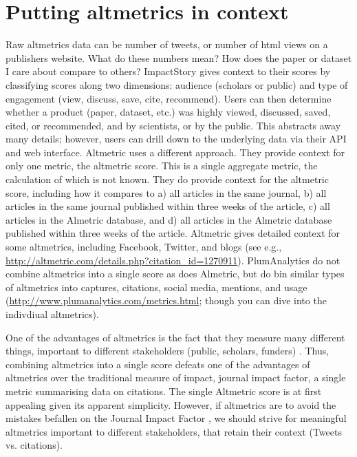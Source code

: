 \documentclass[letterpaper,superscriptaddress,showkeys,longbibliography]{revtex4-1}\usepackage{graphicx, color}
\begin{document}
\section*{Putting altmetrics in context}

Raw altmetrics data can be number of tweets, or number of html views on a publishers website. What do these numbers mean? How does the paper or dataset I care about compare to others? ImpactStory gives context to their scores by classifying scores along two dimensions: audience (scholars or public) and type of engagement (view, discuss, save, cite, recommend). Users can then determine whether a product (paper, dataset, etc.) was highly viewed, discussed, saved, cited, or recommended, and by scientists, or by the public. This abstracts away many details; however, users can drill down to the underlying data via their API and web interface.  Altmetric uses a different approach. They provide context for only one metric, the altmetric score. This is a single aggregate metric, the calculation of which is not known. They do provide context for the altmetric score, including how it compares to a) all articles in the same journal, b) all articles in the same journal published within three weeks of the article, c) all articles in the Almetric database, and d) all articles in the Almetric database published within three weeks of the article. Altmetric gives detailed context for some altmetrics, including Facebook, Twitter, and blogs (see e.g., \url{http://altmetric.com/details.php?citation_id=1270911}). PlumAnalytics do not combine altmetrics into a single score as does Almetric, but do bin similar types of altmetrics into captures, citations, social media, mentions, and usage (\url{http://www.plumanalytics.com/metrics.html}; though you can dive into the indivdiual altmetrics). 

One of the advantages of altmetrics is the fact that they measure many different things, important to different stakeholders (public, scholars, funders) \cite{x,y}. Thus, combining altmetrics into a single score defeats one of the advantages of altmetrics over the traditional measure of impact, journal impact factor, a single metric summarising data on citations. The single Altmetric score is at first appealing given its apparent simplicity. However, if altmetrics are to avoid the mistakes befallen on the Journal Impact Factor \cite{ploseditorial}, we should strive for meaningful altmetrics important to different stakeholders, that retain their context (Tweets vs. citations). 
\end{document}
